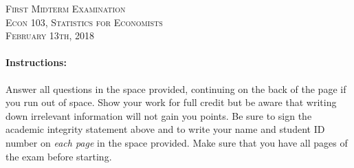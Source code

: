 \documentclass[addpoints,12pt]{exam}
\begin{document}
\begin{center}
\textsc{\large First Midterm Examination\\ \normalsize Econ 103, Statistics for Economists \\ \vspace{0.5em} February 13th, 2018}

\vspace{2em}



\end{center}


\vspace{2em}
\begin{center}
\end{center}
\vspace{0.2in}

\vspace{0.2in}

\noindent{}

\vspace{0.2in}

\noindent{}
\hfill
{}

\vspace{2em}

\begin{center}
  \gradetable[h][questions]
\end{center}

\vspace{2em}

\paragraph{Instructions:} Answer all questions in the space provided, continuing on the back of the page if you run out of space. Show your work for full credit but be aware that writing down irrelevant information will not gain you points. Be sure to sign the academic integrity statement above and to write your name and student ID number on \emph{each page} in the space provided. Make sure that you have all pages of the exam before starting.
\end{document}
